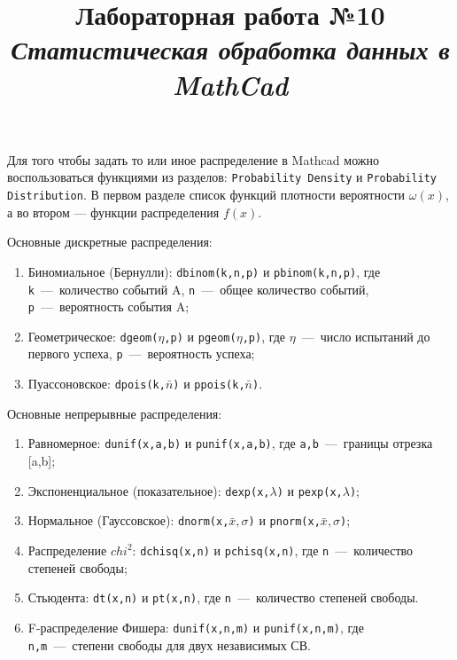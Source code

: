 \documentclass[14pt,a4paper]{article}
\title{Лабораторная работа №10 \\ \textit{Статистическая обработка данных в MathCad}}
\begin{document}
\maketitle
Для того чтобы задать то или иное распределение в Mathcad можно воспользоваться функциями из разделов: \texttt{Probability Density} и \texttt{Probability Distribution}. В первом разделе список функций плотности вероятности $\omega(x)$, а во втором --- функции распределения $f(x)$. 

Основные дискретные распределения: 
\begin{enumerate}
	\item Биномиальное (Бернулли): \texttt{dbinom(k,n,p)} и \texttt{pbinom(k,n,p)}, где \texttt{k}~---~количество событий A, \texttt{n}~---~общее количество событий, \texttt{p}~---~вероятность события A;
	\item Геометрическое: \texttt{dgeom($\eta$,p)} и \texttt{pgeom($\eta$,p)}, где $\eta$~---~число испытаний до первого успеха, \texttt{p}~---~вероятность успеха;
	\item Пуассоновское: \texttt{dpois(k,$\bar{n}$)} и \texttt{ppois(k,$\bar{n}$)}.
\end{enumerate}
Основные непрерывные распределения: 
\begin{enumerate}
	\item Равномерное: \texttt{dunif(x,a,b)} и \texttt{punif(x,a,b)}, где \texttt{a,b}~---~границы отрезка [a,b];
	\item Экспоненциальное (показательное): \texttt{dexp(x,$\lambda$)} и \texttt{pexp(x,$\lambda$)};
	\item Нормальное (Гауссовское): \texttt{dnorm(x,$\bar{x}, \sigma$)} и \texttt{pnorm(x,$\bar{x}, \sigma$)};
	\item Распределение $chi^2$: \texttt{dchisq(x,n)} и \texttt{pchisq(x,n)}, где \texttt{n}~---~количество степеней свободы;
	\item Стьюдента:  \texttt{dt(x,n)} и \texttt{pt(x,n)}, где \texttt{n}~---~количество степеней свободы.
	\item F-распределение Фишера: \texttt{dunif(x,n,m)} и \texttt{punif(x,n,m)}, где \texttt{n,m}~---~степени свободы для двух независимых СВ.
\end{enumerate}
\progress{}
\end{document}
